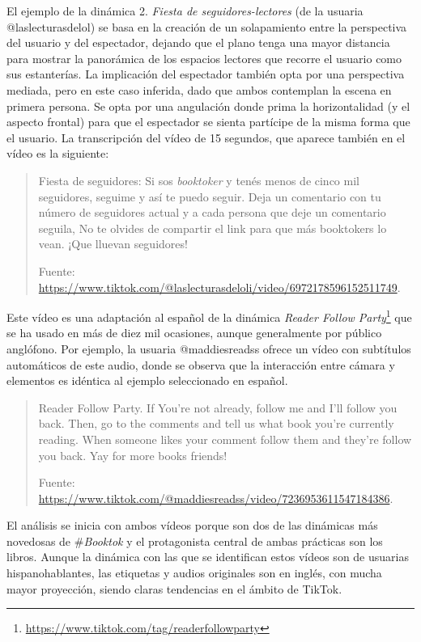 El ejemplo de la dinámica 2. \emph{Fiesta de seguidores-lectores} (de la
usuaria @laslecturasdelol) se basa en la creación de un solapamiento
entre la perspectiva del usuario y del espectador, dejando que el plano
tenga una mayor distancia para mostrar la panorámica de los espacios
lectores que recorre el usuario como sus estanterías. La implicación del
espectador también opta por una perspectiva mediada, pero en este caso
inferida, dado que ambos contemplan la escena en primera persona. Se
opta por una angulación donde prima la horizontalidad (y el aspecto
frontal) para que el espectador se sienta partícipe de la misma forma
que el usuario. La transcripción del vídeo de 15 segundos, que aparece
también en el vídeo es la siguiente:
\begin{quote}
		Fiesta de seguidores: Si sos \emph{booktoker} y tenés menos de cinco mil
		seguidores, seguime y así te puedo seguir. Deja un comentario con tu
		número de seguidores actual y a cada persona que deje un comentario
		seguila, No te olvides de compartir el link para que más booktokers lo
		vean. ¡Que lluevan seguidores!
		
		Fuente:
		\url{https://www.tiktok.com/@laslecturasdeloli/video/6972178596152511749}.
\end{quote}

Este vídeo es una adaptación al español de la dinámica \emph{Reader Follow Party}\footnote{\url{https://www.tiktok.com/tag/readerfollowparty}}
que se ha usado en más de diez mil ocasiones, aunque generalmente por
público anglófono. Por ejemplo, la usuaria @maddiesreadss ofrece un
vídeo con subtítulos automáticos de este audio, donde se observa que la
interacción entre cámara y elementos es idéntica al ejemplo seleccionado
en español.

\begin{quote}
	Reader Follow Party. If You're not already, follow me and I'll follow
	you back. Then, go to the comments and tell us what book you're
	currently reading. When someone likes your comment follow them and
	they're follow you back. Yay for more books friends!
	
	Fuente:
	\url{https://www.tiktok.com/@maddiesreadss/video/7236953611547184386}.
\end{quote}


El análisis se inicia con ambos vídeos porque son dos de las dinámicas
más novedosas de \#\emph{Booktok} y el protagonista central de ambas
prácticas son los libros. Aunque la dinámica con las que se identifican
estos vídeos son de usuarias hispanohablantes, las etiquetas y audios
originales son en inglés, con mucha mayor proyección, siendo claras
tendencias en el ámbito de TikTok.

